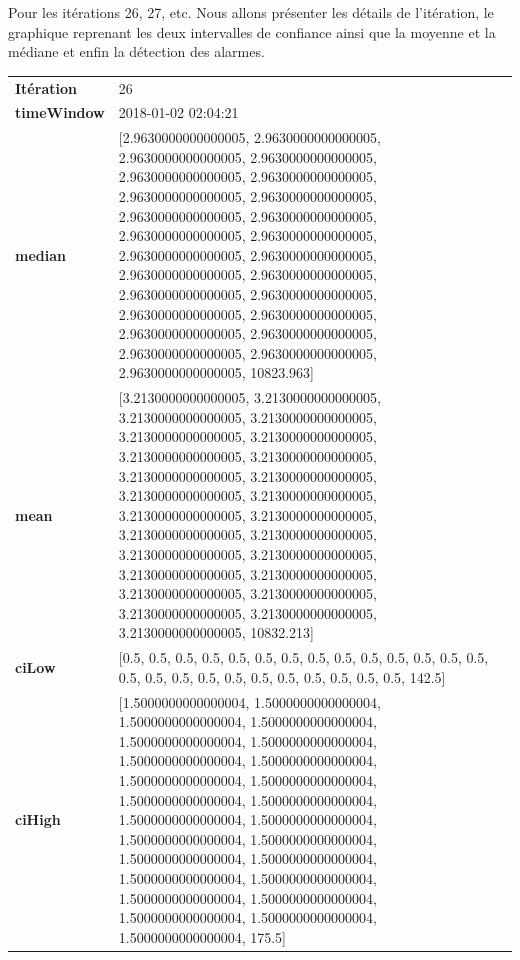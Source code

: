 Pour les itérations 26, 27,  etc. Nous allons présenter les détails de l'itération, le graphique reprenant les deux intervalles de confiance ainsi que la moyenne et la médiane et enfin la détection des alarmes.

\begin{table}[H]
	\centering
	\begin{tabularx}{\textwidth}{lX}
		\textbf{Itération}&26 \\
		\textbf{timeWindow}& 2018-01-02 02:04:21 \\
		\textbf{median} &[2.9630000000000005, 2.9630000000000005, 2.9630000000000005, 2.9630000000000005, 2.9630000000000005, 2.9630000000000005, 2.9630000000000005, 2.9630000000000005, 2.9630000000000005, 2.9630000000000005, 2.9630000000000005, 2.9630000000000005, 2.9630000000000005, 2.9630000000000005, 2.9630000000000005, 2.9630000000000005, 2.9630000000000005, 2.9630000000000005, 2.9630000000000005, 2.9630000000000005, 2.9630000000000005, 2.9630000000000005, 2.9630000000000005, 2.9630000000000005, 2.9630000000000005, 10823.963] \\
		\textbf{mean} & [3.2130000000000005, 3.2130000000000005, 3.2130000000000005, 3.2130000000000005, 3.2130000000000005, 3.2130000000000005, 3.2130000000000005, 3.2130000000000005, 3.2130000000000005, 3.2130000000000005, 3.2130000000000005, 3.2130000000000005, 3.2130000000000005, 3.2130000000000005, 3.2130000000000005, 3.2130000000000005, 3.2130000000000005, 3.2130000000000005, 3.2130000000000005, 3.2130000000000005, 3.2130000000000005, 3.2130000000000005, 3.2130000000000005, 3.2130000000000005, 3.2130000000000005, 10832.213] \\
		\textbf{ciLow}& [0.5, 0.5, 0.5, 0.5, 0.5, 0.5, 0.5, 0.5, 0.5, 0.5, 0.5, 0.5, 0.5, 0.5, 0.5, 0.5, 0.5, 0.5, 0.5, 0.5, 0.5, 0.5, 0.5, 0.5, 0.5, 142.5] \\
		\textbf{ciHigh}& [1.5000000000000004, 1.5000000000000004, 1.5000000000000004, 1.5000000000000004, 1.5000000000000004, 1.5000000000000004, 1.5000000000000004, 1.5000000000000004, 1.5000000000000004, 1.5000000000000004, 1.5000000000000004, 1.5000000000000004, 1.5000000000000004, 1.5000000000000004, 1.5000000000000004, 1.5000000000000004, 1.5000000000000004, 1.5000000000000004, 1.5000000000000004, 1.5000000000000004, 1.5000000000000004, 1.5000000000000004, 1.5000000000000004, 1.5000000000000004, 1.5000000000000004, 175.5] \\
		
			\end{tabularx} 
		\end{table}
		
